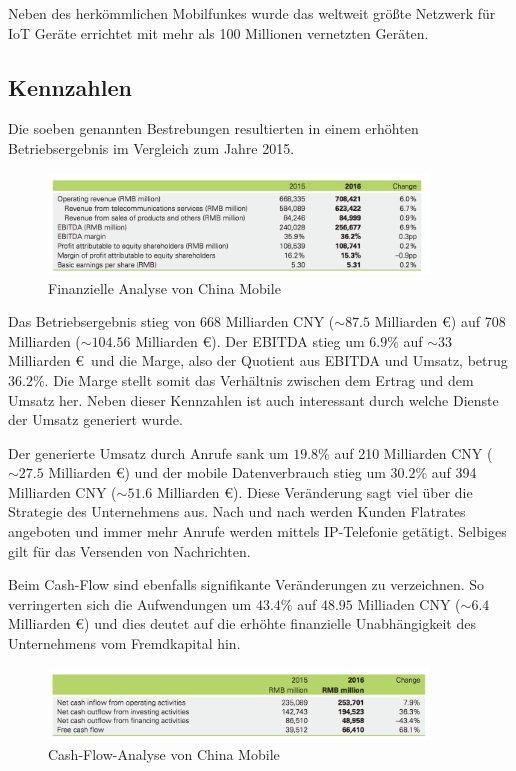 Neben des herkömmlichen Mobilfunkes wurde das weltweit größte Netzwerk für IoT Geräte errichtet mit mehr als 100 Millionen vernetzten Geräten. 

\subsection{Kennzahlen}

Die soeben genannten Bestrebungen resultierten in einem erhöhten Betriebsergebnis im Vergleich zum Jahre 2015.

\begin{figure}[H]
\centering
\includegraphics[width=0.9\textwidth]{pictures/finances}
\caption{Finanzielle Analyse von China Mobile \cite{chinareport}}
\label{fig:lteplus}
\end{figure}

Das Betriebsergebnis stieg von 668 Milliarden CNY ($\sim 87.5$ Milliarden \euro) auf 708 Milliarden ($\sim 104.56$ Milliarden \euro). Der EBITDA stieg um $6.9\%$ auf $\sim 33$ Milliarden \euro \ und die Marge, also der Quotient aus EBITDA und Umsatz, betrug $36.2\%$. Die Marge stellt somit das Verhältnis zwischen dem Ertrag und dem Umsatz her. Neben dieser Kennzahlen ist auch interessant durch welche Dienste der Umsatz generiert wurde. 

Der generierte Umsatz durch Anrufe sank um $19.8\%$ auf 210 Milliarden CNY ($\sim 27.5$ Milliarden \euro) und der mobile Datenverbrauch stieg um $30.2\%$ auf 394 Milliarden CNY ($\sim 51.6$ Milliarden \euro). Diese Veränderung sagt viel über die Strategie des Unternehmens aus. Nach und nach werden Kunden Flatrates angeboten und immer mehr Anrufe werden mittels IP-Telefonie getätigt. Selbiges gilt für das Versenden von Nachrichten.  

Beim Cash-Flow sind ebenfalls signifikante Veränderungen zu verzeichnen. So verringerten sich die Aufwendungen um $43.4\%$ auf $48.95$ Milliaden CNY ($\sim 6.4$ Milliarden \euro) und dies deutet auf die erhöhte finanzielle Unabhängigkeit des Unternehmens vom Fremdkapital hin.

\begin{figure}[H]
\centering
\includegraphics[width=0.9\textwidth]{pictures/cashflow}
\caption{Cash-Flow-Analyse von China Mobile \cite{chinareport}}
\label{fig:lteplus}
\end{figure}

